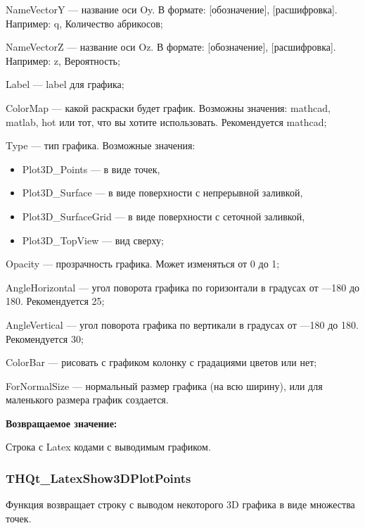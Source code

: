 \documentclass[a4paper,12pt]{article}
\begin{document}
NameVectorY --- название оси Oy. В формате: [обозначение], [расшифровка]. Например: q, Количество абрикосов;
 
NameVectorZ --- название оси Oz. В формате: [обозначение], [расшифровка]. Например: z, Вероятность;
 
Label --- label для графика;
 
ColorMap --- какой раскраски будет график. Возможны значения: mathcad, matlab, hot или тот, что вы хотите использовать. Рекомендуется mathcad;
 
Type --- тип графика. Возможные значения:

\begin{itemize}
\item Plot3D\_Points --- в виде точек,
 
\item Plot3D\_Surface --- в виде поверхности с непрерывной заливкой,
 
\item Plot3D\_SurfaceGrid --- в виде поверхности с сеточной заливкой,
 
\item Plot3D\_TopView --- вид сверху;
\end{itemize}
 
Opacity --- прозрачность графика. Может изменяться от 0 до 1;
 
AngleHorizontal --- угол поворота графика по горизонтали в градусах от ---180 до 180. Рекомендуется 25;
 
AngleVertical --- угол поворота графика по вертикали в градусах от ---180 до 180. Рекомендуется 30;
 
ColorBar --- рисовать с графиком колонку с градациями цветов или нет;
 
ForNormalSize --- нормальный размер графика (на всю ширину), или для маленького размера график создается.
	
\textbf{Возвращаемое значение:}

Строка с Latex кодами с выводимым графиком.


\subsubsection{THQt\_LatexShow3DPlotPoints}\label{THQt_LatexShow3DPlotPoints}

Функция возвращает строку с выводом некоторого 3D графика в виде множества точек.
\end{document}
